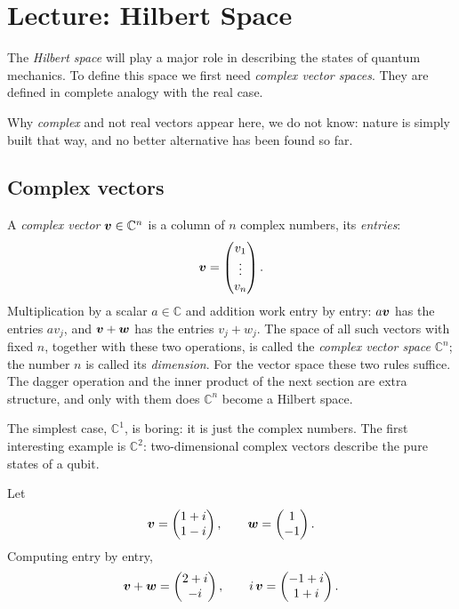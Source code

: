 
\section{Lecture: Hilbert Space}
The \emph{Hilbert space} will play a major role in describing the states of quantum mechanics. To define this space we first need \emph{complex vector spaces}. They are defined in complete analogy with the real case.

Why \emph{complex} and not real vectors appear here, we do not know: nature is simply built that way, and no better alternative has been found so far.

\subsection{Complex vectors}
A \emph{complex vector} $\boldsymbol{v}\in\mathbb{C}^n$ is a column of $n$ complex numbers, its \emph{entries}:
\begin{equation}
	\boldsymbol{v} = \begin{pmatrix} v_1 \\ \vdots \\ v_n \end{pmatrix}.
\end{equation}
Multiplication by a scalar $a\in\mathbb{C}$ and addition work entry by entry: $a\boldsymbol{v}$ has the entries $a v_j$, and $\boldsymbol{v}+\boldsymbol{w}$ has the entries $v_j+w_j$. The space of all such vectors with fixed $n$, together with these two operations, is called the \emph{complex vector space} $\mathbb{C}^n$; the number $n$ is called its \emph{dimension}. For the vector space these two rules suffice. The dagger operation and the inner product of the next section are extra structure, and only with them does $\mathbb{C}^n$ become a Hilbert space.

The simplest case, $\mathbb{C}^1$, is boring: it is just the complex numbers. The first interesting example is $\mathbb{C}^2$: two-dimensional complex vectors describe the pure states of a qubit.

\begin{example}
	Let
	\begin{equation}
		\boldsymbol{v} = \begin{pmatrix} 1+i \\ 1-i \end{pmatrix}, \qquad
		\boldsymbol{w} = \begin{pmatrix} 1 \\ -1 \end{pmatrix}.
	\end{equation}
	Computing entry by entry,
	\begin{equation}
		\boldsymbol{v}+\boldsymbol{w} = \begin{pmatrix} 2+i \\ -i \end{pmatrix}, \qquad
		i\,\boldsymbol{v} = \begin{pmatrix} -1+i \\ 1+i \end{pmatrix}.
	\end{equation}
\end{example}

